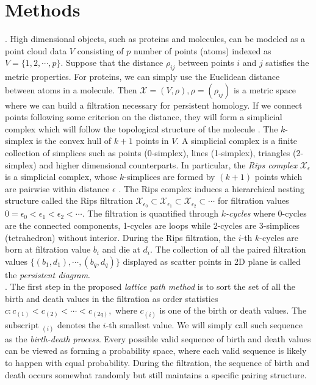 \documentclass{llncs}
\begin{document}
\section{Methods}
.
High dimensional objects, such as proteins and molecules, can be modeled as a point cloud data $V$ consisting of $p$ number of points (atoms) indexed as $V=\{1, 2, \cdots, p\}$. Suppose that the distance $\rho_{ij}$ between points $i$ and $j$ satisfies the metric properties. For proteins, we can simply use the Euclidean distance between atoms in a molecule. Then $\mathcal{X} = (V, \rho), \rho=(\rho_{ij})$ is a metric space where we can build a filtration necessary for persistent homology. If we connect points following some criterion on the distance, they will form a simplicial complex which will follow the topological structure of the molecule \cite{edelsbrunner.2010,hart.1999,zomorodian.2009}.  The $k$-simplex  is the convex hull of $k+1$ points in $V$.  A simplicial complex is a finite collection of simplices such as points (0-simplex), lines (1-simplex), triangles (2-simplex) and higher dimensional counterparts. In particular, the {\em Rips complex} $\mathcal{X}_{\epsilon}$ is a simplicial complex, whose $k$-simplices are formed by $(k+1)$ points which are pairwise within distance $\epsilon$ \cite{ghrist.2008}. The Rips complex induces a hierarchical nesting structure called  the Rips  filtration
$\mathcal{X}_{\epsilon_0} \subset \mathcal{X}_{\epsilon_1}\subset \mathcal{X}_{\epsilon_2}\subset \cdots $
for filtration values $0=\epsilon_{0} < \epsilon_{1} < \epsilon_{2} < \cdots$. The filtration is quantified through {\em $k$-cycles} where 0-cycles are the connected components, 1-cycles are loops while 2-cycles are 3-simplices (tetrahedron) without interior.  During the Rips filtration, the $i$-th $k$-cycles are born at filtration value $b_i$ and die at $d_i$. The collection of all the paired filtration values $\{ (b_1, d_1), \cdots, (b_q, d_q) \}$ displayed as scatter points in 2D plane is called the {\em persistent diagram}.\\ 

. The first step in the proposed {\em lattice path method} is to sort the set of all the birth and death values in the filtration as 
order statistics $c: c_{(1)} < c_{(2)} < \cdots < c_{(2q)},$
where $c_{(i)}$ is one of the birth or death values. The subscript $_{(i)}$ denotes the $i$-th smallest value. We will simply call such sequence as the {\em birth-death process}. 
Every possible valid sequence of birth and death values can be viewed as forming a probability space, where each valid sequence is likely to happen with equal probability. 
During the filtration, the sequence of birth and death occurs somewhat randomly but still maintains a specific pairing structure. 
\end{document}
